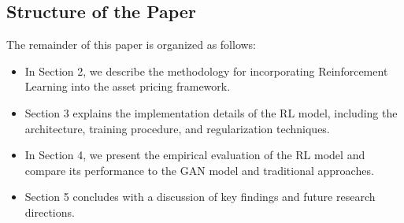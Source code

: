 \subsection{Structure of the Paper}

The remainder of this paper is organized as follows:

\begin{itemize}
    \item In Section 2, we describe the methodology for incorporating Reinforcement Learning into the asset pricing framework.
    \item Section 3 explains the implementation details of the RL model, including the architecture, training procedure, and regularization techniques.
    \item In Section 4, we present the empirical evaluation of the RL model and compare its performance to the GAN model and traditional approaches.
    \item Section 5 concludes with a discussion of key findings and future research directions.
\end{itemize}

